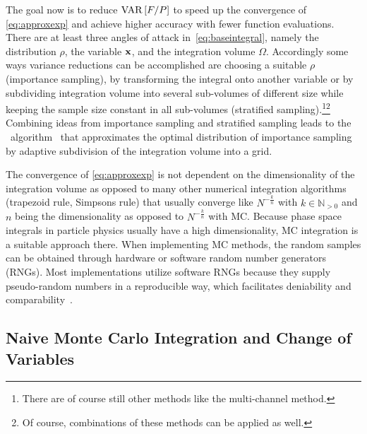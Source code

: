 %
The goal now is to reduce \(\operatorname{VAR}\qty[F/P]\) to speed up the convergence
of \cref{eq:approxexp} and achieve higher accuracy with fewer function
evaluations. There are at least three angles of attack
in~\ref{eq:baseintegral}, namely the distribution \(\rho\), the
variable \(\vb{x}\), and the integration volume
\(\Omega\). Accordingly some ways variance reductions can be
accomplished are choosing a suitable \(\rho\) (importance sampling),
by transforming the integral onto another variable or by subdividing
integration volume into several sub-volumes of different size while
keeping the sample size constant in all sub-volumes (stratified
sampling).\footnote{There are of course still other methods like the
  multi-channel method.}\footnote{Of course, combinations of these
  methods can be applied as well.}  Combining ideas from importance
sampling and stratified sampling leads to the \vegas\
algorithm~\cite{Lepage:19781an} that approximates the optimal
distribution of importance sampling by adaptive subdivision of the
integration volume into a grid.

The convergence of \cref{eq:approxexp} is not dependent on the
dimensionality of the integration volume as opposed to many other
numerical integration algorithms (trapezoid rule, Simpsons rule) that
usually converge like \(N^{-\frac{k}{n}}\) with
\(k\in\mathbb{N}_{>0}\) and \(n\) being the dimensionality as opposed
to \(N^{-\frac{k}{n}}\) with MC. Because phase space integrals in
particle physics usually have a high dimensionality, MC integration is
a suitable approach there. When implementing MC methods, the random
samples can be obtained through hardware or software random number
generators (RNGs). Most implementations utilize software RNGs because
they supply pseudo-random numbers in a reproducible way, which
facilitates deniability and comparability~\cite{buckley:2011ge}.

\subsection{Naive Monte Carlo Integration and Change of Variables}
\label{sec:naivechange}

